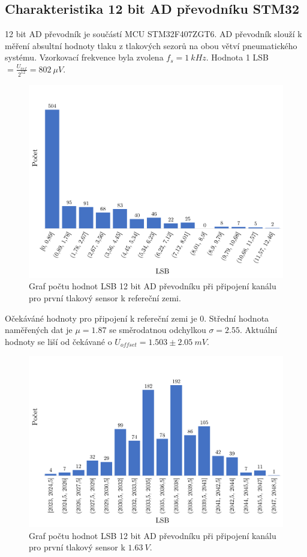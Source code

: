 \subsection{Charakteristika 12 bit AD převodníku STM32}
12 bit AD převodník je součástí MCU STM32F407ZGT6. AD převodník slouží k měření absultní hodnoty tlaku z tlakových sezorů na obou větví pneumatického systému. Vzorkovací frekvence byla zvolena $f_s = 1 \ kHz$.
Hodnota 1 LSB $= \frac{U_{ref}}{2^{12}} = 802 \ \mu V$.
\begin{figure}[H]
    \caption{Graf počtu hodnot LSB 12 bit AD převodníku při připojení kanálu pro první tlakový sensor k refereční zemi.}
    \label{fig:hist_vacuum1_gnd}
    \includegraphics[width=1\textwidth]{graphs/vacuum1_gnd.png}

\end{figure}
Očekáváné hodnoty pro připojení k refereční zemi je 0. Střední hodnota naměřených dat je $\mu = 1.87$ se směrodatnou odchylkou $\sigma = 2.55$. Aktuální hodnoty se liší od čekávané o $U_{offset} = 1.503 \pm 2.05 \ mV$.

\begin{figure}[H]
    \caption{Graf počtu hodnot LSB 12 bit AD převodníku při připojení kanálu pro první tlakový sensor k $1.63 \ V$.}
    \label{fig:hist_vacuum1_1_6}
    \includegraphics[width=1\textwidth]{graphs/vacuum1_16.png}

\end{figure}

